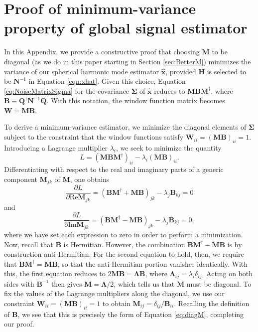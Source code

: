 \documentclass[twocolumn,apj,numberedappendix]{emulateapj}
\newcommand{\xhat}{\hat{\mathbf{x}}}
\newcommand{\N}{\mathbf{N}}
\newcommand{\Hmat}{\mathbf{H}}
\newcommand{\Q}{\mathbf{Q}}
\newcommand{\M}{\mathbf{M}}
\newcommand{\W}{\mathbf{W}}
\begin{document}
\appendix
\section{Proof of minimum-variance property of global signal estimator}
\label{minVarProof}

In this Appendix, we provide a constructive proof that choosing $\M$ to be diagonal (as we do in this paper starting in Section \ref{sec:BetterM}) minimizes the variance of our spherical harmonic mode estimator $\xhat$, provided $\Hmat$ is selected to be $\mathbf{N}^{-1}$ in Equation \eqref{eqn:xhat}. Given this choice, Equation \eqref{eq:NoiseMatrixSigma} for the covariance $\boldsymbol \Sigma$ of $\xhat$ reduces to  $\M \mathbf{B} \M^\dagger$, where $\mathbf{B} \equiv \Q^\dagger \N^{-1} \Q$. With this notation, the window function matrix becomes $\W = \M \mathbf{B}$.

To derive a minimum-variance estimator, we minimize the diagonal elements of $\boldsymbol \Sigma$ subject to the constraint that the window functions satisfy $\W_{ii} = (\M \mathbf{B})_{ii} =1$. Introducing a Lagrange multiplier $\lambda_i$, we seek to minimize the quantity
\begin{equation}
L = (\M \mathbf{B} \M^\dagger)_{ii} - \lambda_i  (\M \mathbf{B})_{ii}.
\end{equation}
Differentiating with respect to the real and imaginary parts of a generic component $\M_{jk}$ of $\M$, one obtains
\begin{equation}
\frac{\partial L}{\partial \textrm{Re} \M_{jk}} = (\mathbf{B} \M^\dagger + \M \mathbf{B})_{jk} - \lambda_j \mathbf{B}_{kj} =0
\end{equation}
and
\begin{equation}
\frac{\partial L}{\partial \textrm{Im} \M_{jk}} = (\mathbf{B} \M^\dagger - \M \mathbf{B})_{jk} - \lambda_j \mathbf{B}_{kj} =0,
\end{equation}
where we have set each expression to zero in order to perform a minimization. Now, recall that $\mathbf{B}$ is Hermitian. However, the combination $\mathbf{B} \M^\dagger - \M \mathbf{B}$ is by construction anti-Hermitian. For the second equation to hold, then, we require that $\mathbf{B} \M^\dagger = \M \mathbf{B}$, so that the anti-Hermitian portion vanishes identically. With this, the first equation reduces to $2 \M \mathbf{B} = \boldsymbol \Lambda \mathbf{B}$, where $\boldsymbol \Lambda_{ij} = \lambda_i \delta_{ij}$. Acting on both sides with $\mathbf{B}^{-1}$ then gives $\M = \boldsymbol \Lambda / 2$, which tells us that $\M$ must be diagonal. To fix the values of the Lagrange multipliers along the diagonal, we use our constraint $\W_{ii} = (\M \mathbf{B})_{ii} =1$ to obtain $\M_{ij} = \delta_{ij} / \mathbf{B}_{ii}$. Recalling the definition of $\mathbf{B}$, we see that this is precisely the form of Equation \eqref{eq:diagM}, completing our proof.
\end{document}
